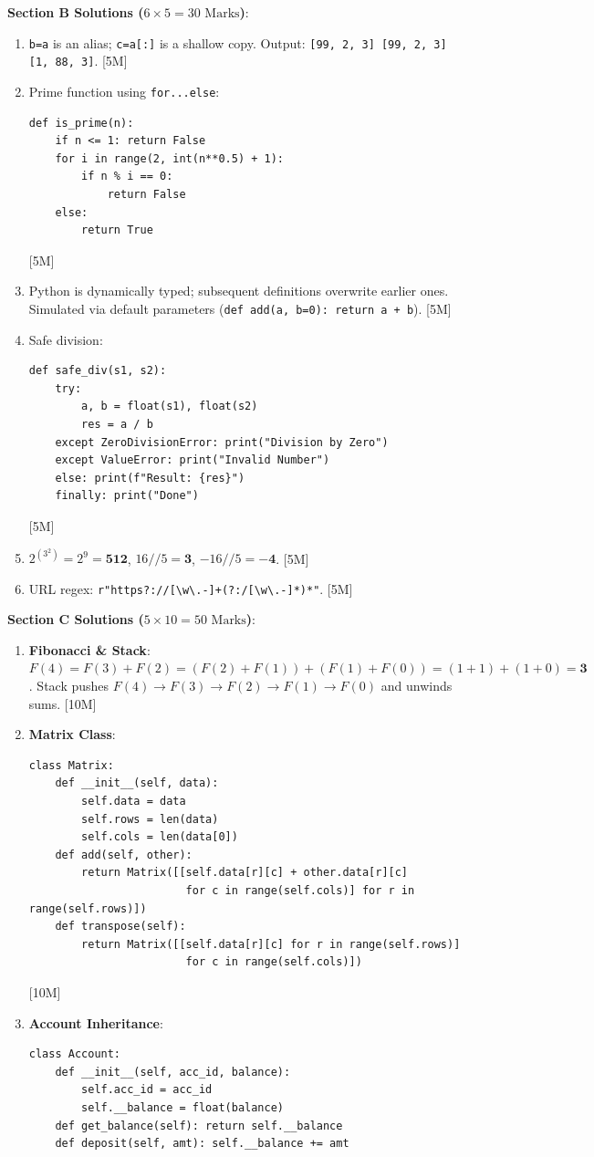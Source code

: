 \begin{solutionbox}
\medskip
\noindent\textbf{Section B Solutions ($6 \times 5 = 30\text{ Marks}$)}:
\begin{enumerate}[start=11]
    \item \texttt{b=a} is an alias; \texttt{c=a[:]} is a shallow copy. Output: \texttt{[99, 2, 3] [99, 2, 3] [1, 88, 3]}. [5M]
    \item Prime function using \texttt{for...else}:
    \begin{lstlisting}[language=Python3]
def is_prime(n):
    if n <= 1: return False
    for i in range(2, int(n**0.5) + 1):
        if n % i == 0:
            return False
    else:
        return True
    \end{lstlisting} [5M]
    \item Python is dynamically typed; subsequent definitions overwrite earlier ones. Simulated via default parameters (\texttt{def add(a, b=0): return a + b}). [5M]
    \item Safe division:
    \begin{lstlisting}[language=Python3]
def safe_div(s1, s2):
    try:
        a, b = float(s1), float(s2)
        res = a / b
    except ZeroDivisionError: print("Division by Zero")
    except ValueError: print("Invalid Number")
    else: print(f"Result: {res}")
    finally: print("Done")
    \end{lstlisting} [5M]
    \item $2^{(3^2)} = 2^9 = \mathbf{512}$, $16 // 5 = \mathbf{3}$, $-16 // 5 = \mathbf{-4}$. [5M]
    \item URL regex: \texttt{r"https?://[\textbackslash w\textbackslash.-]+(?:/[\textbackslash w\textbackslash.-]*)*"}. [5M]
\end{enumerate}

\medskip
\noindent\textbf{Section C Solutions ($5 \times 10 = 50\text{ Marks}$)}:
\begin{enumerate}[start=17]
    \item \textbf{Fibonacci \& Stack}: $F(4) = F(3) + F(2) = (F(2)+F(1)) + (F(1)+F(0)) = (1+1) + (1+0) = \mathbf{3}$. Stack pushes $F(4) \to F(3) \to F(2) \to F(1) \to F(0)$ and unwinds sums. [10M]
    \item \textbf{Matrix Class}:
    \begin{lstlisting}[language=Python3]
class Matrix:
    def __init__(self, data):
        self.data = data
        self.rows = len(data)
        self.cols = len(data[0])
    def add(self, other):
        return Matrix([[self.data[r][c] + other.data[r][c] 
                        for c in range(self.cols)] for r in range(self.rows)])
    def transpose(self):
        return Matrix([[self.data[r][c] for r in range(self.rows)] 
                        for c in range(self.cols)])
    \end{lstlisting} [10M]
    \item \textbf{Account Inheritance}:
    \begin{lstlisting}[language=Python3]
class Account:
    def __init__(self, acc_id, balance):
        self.acc_id = acc_id
        self.__balance = float(balance)
    def get_balance(self): return self.__balance
    def deposit(self, amt): self.__balance += amt


\end{lstlisting}
\end{enumerate}
\end{solutionbox}
